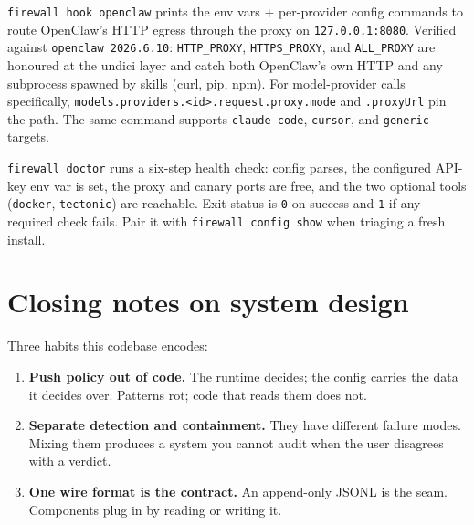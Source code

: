\documentclass[11pt,a4paper]{article}
\begin{document}
\texttt{firewall hook openclaw} prints the env vars + per-provider
config commands to route OpenClaw's HTTP egress through the proxy on
\texttt{127.0.0.1:8080}. Verified against \texttt{openclaw 2026.6.10}:
\texttt{HTTP\_PROXY}, \texttt{HTTPS\_PROXY}, and \texttt{ALL\_PROXY} are
honoured at the undici layer and catch both OpenClaw's own HTTP and
any subprocess spawned by skills (curl, pip, npm). For model-provider
calls specifically, \texttt{models.providers.<id>.request.proxy.mode}
and \texttt{.proxyUrl} pin the path. The same command supports
\texttt{claude-code}, \texttt{cursor}, and \texttt{generic} targets.

\texttt{firewall doctor} runs a six-step health check: config parses,
the configured API-key env var is set, the proxy and canary ports are
free, and the two optional tools (\texttt{docker},
\texttt{tectonic}) are reachable. Exit status is \texttt{0} on success
and \texttt{1} if any required check fails. Pair it with
\texttt{firewall config show} when triaging a fresh install.

\section*{Closing notes on system design}

Three habits this codebase encodes:
\begin{enumerate}
  \item \textbf{Push policy out of code.} The runtime decides; the
    config carries the data it decides over. Patterns rot; code that
    reads them does not.
  \item \textbf{Separate detection and containment.} They have different
    failure modes. Mixing them produces a system you cannot audit when
    the user disagrees with a verdict.
  \item \textbf{One wire format is the contract.} An append-only JSONL
    is the seam. Components plug in by reading or writing it.
\end{enumerate}
\end{document}
